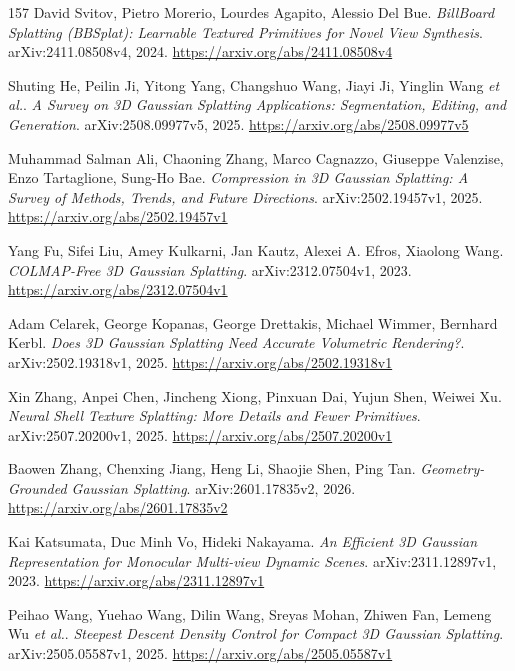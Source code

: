 \documentclass[11pt,a4paper]{article}
\begin{document}
\begin{thebibliography}{157}
David Svitov, Pietro Morerio, Lourdes Agapito, Alessio Del Bue.
\newblock \emph{BillBoard Splatting (BBSplat): Learnable Textured Primitives for Novel View Synthesis}.
\newblock arXiv:2411.08508v4, 2024.
\newblock \url{https://arxiv.org/abs/2411.08508v4}

Shuting He, Peilin Ji, Yitong Yang, Changshuo Wang, Jiayi Ji, Yinglin Wang \emph{et al.}.
\newblock \emph{A Survey on 3D Gaussian Splatting Applications: Segmentation, Editing, and Generation}.
\newblock arXiv:2508.09977v5, 2025.
\newblock \url{https://arxiv.org/abs/2508.09977v5}

Muhammad Salman Ali, Chaoning Zhang, Marco Cagnazzo, Giuseppe Valenzise, Enzo Tartaglione, Sung-Ho Bae.
\newblock \emph{Compression in 3D Gaussian Splatting: A Survey of Methods, Trends, and Future Directions}.
\newblock arXiv:2502.19457v1, 2025.
\newblock \url{https://arxiv.org/abs/2502.19457v1}

Yang Fu, Sifei Liu, Amey Kulkarni, Jan Kautz, Alexei A. Efros, Xiaolong Wang.
\newblock \emph{COLMAP-Free 3D Gaussian Splatting}.
\newblock arXiv:2312.07504v1, 2023.
\newblock \url{https://arxiv.org/abs/2312.07504v1}

Adam Celarek, George Kopanas, George Drettakis, Michael Wimmer, Bernhard Kerbl.
\newblock \emph{Does 3D Gaussian Splatting Need Accurate Volumetric Rendering?}.
\newblock arXiv:2502.19318v1, 2025.
\newblock \url{https://arxiv.org/abs/2502.19318v1}

Xin Zhang, Anpei Chen, Jincheng Xiong, Pinxuan Dai, Yujun Shen, Weiwei Xu.
\newblock \emph{Neural Shell Texture Splatting: More Details and Fewer Primitives}.
\newblock arXiv:2507.20200v1, 2025.
\newblock \url{https://arxiv.org/abs/2507.20200v1}

Baowen Zhang, Chenxing Jiang, Heng Li, Shaojie Shen, Ping Tan.
\newblock \emph{Geometry-Grounded Gaussian Splatting}.
\newblock arXiv:2601.17835v2, 2026.
\newblock \url{https://arxiv.org/abs/2601.17835v2}

Kai Katsumata, Duc Minh Vo, Hideki Nakayama.
\newblock \emph{An Efficient 3D Gaussian Representation for Monocular Multi-view Dynamic Scenes}.
\newblock arXiv:2311.12897v1, 2023.
\newblock \url{https://arxiv.org/abs/2311.12897v1}

Peihao Wang, Yuehao Wang, Dilin Wang, Sreyas Mohan, Zhiwen Fan, Lemeng Wu \emph{et al.}.
\newblock \emph{Steepest Descent Density Control for Compact 3D Gaussian Splatting}.
\newblock arXiv:2505.05587v1, 2025.
\newblock \url{https://arxiv.org/abs/2505.05587v1}


\end{thebibliography}
\end{document}
